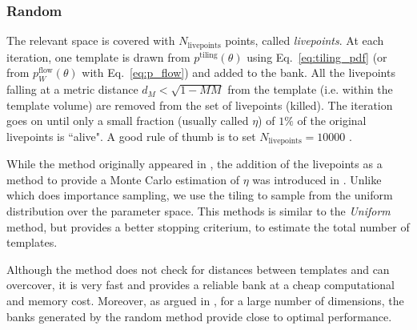 \documentclass[twocolumn,showpacs,preprintnumbers,nofootinbib,prd,
superscriptaddress,10pt]{revtex4-2}
\begin{document}
\subsubsection{Random}\label{par:random}
The relevant space is covered with $N_\mathrm{livepoints}$ points, called {\it livepoints}.
At each iteration, one template is drawn from $p^{\text{tiling}}(\theta)$ using Eq.~\eqref{eq:tiling_pdf} (or from $p^{\text{flow}}_W(\theta)$ with Eq.~\eqref{eq:p_flow}) and added to the bank. All the livepoints falling at a metric distance $d_M<\sqrt{1-MM}$ from the template (i.e. within the template volume) are removed from the set of livepoints (killed). The iteration goes on until only a small fraction (usually called $\eta$) of $1\%$ of the original livepoints is ``alive". A good rule of thumb is to set $N_\mathrm{livepoints} = 10000$ \cite{Coogan:2022qxs}.

While the method originally appeared in \cite{Messenger:2008ta}, the addition of the livepoints as a method to provide a Monte Carlo estimation of $\eta$ was introduced in \cite{Coogan:2022qxs}. Unlike \cite{Coogan:2022qxs} which does importance sampling, we use the tiling to sample from the uniform distribution over the parameter space.
This methods is similar to the {\it Uniform} method, but provides a better stopping criterium, to estimate the total number of templates.

Although the method does not check for distances between templates and can overcover, it is very fast and provides a reliable bank at a cheap computational and memory cost.
Moreover, as argued in \cite{Messenger:2008ta, Allen:2021yuy, Allen:2022lqr}, for a large number of dimensions, the banks generated by the random method provide close to optimal performance.

\end{document}
